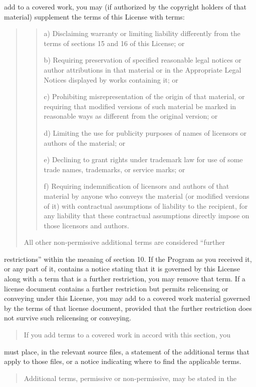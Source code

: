 \documentclass[letterpaper,10pt,english]{sphinxmanual}
\begin{document}
add to a covered work, you may (if authorized by the copyright holders of
that material) supplement the terms of this License with terms:
\begin{quote}
\begin{quote}

a) Disclaiming warranty or limiting liability differently from the
terms of sections 15 and 16 of this License; or

b) Requiring preservation of specified reasonable legal notices or
author attributions in that material or in the Appropriate Legal
Notices displayed by works containing it; or

c) Prohibiting misrepresentation of the origin of that material, or
requiring that modified versions of such material be marked in
reasonable ways as different from the original version; or

d) Limiting the use for publicity purposes of names of licensors or
authors of the material; or

e) Declining to grant rights under trademark law for use of some
trade names, trademarks, or service marks; or

f) Requiring indemnification of licensors and authors of that
material by anyone who conveys the material (or modified versions of
it) with contractual assumptions of liability to the recipient, for
any liability that these contractual assumptions directly impose on
those licensors and authors.
\end{quote}

All other non-permissive additional terms are considered “further
\end{quote}

restrictions” within the meaning of section 10.  If the Program as you
received it, or any part of it, contains a notice stating that it is
governed by this License along with a term that is a further
restriction, you may remove that term.  If a license document contains
a further restriction but permits relicensing or conveying under this
License, you may add to a covered work material governed by the terms
of that license document, provided that the further restriction does
not survive such relicensing or conveying.
\begin{quote}

If you add terms to a covered work in accord with this section, you
\end{quote}

must place, in the relevant source files, a statement of the
additional terms that apply to those files, or a notice indicating
where to find the applicable terms.
\begin{quote}

Additional terms, permissive or non-permissive, may be stated in the
\end{quote}
\end{document}
